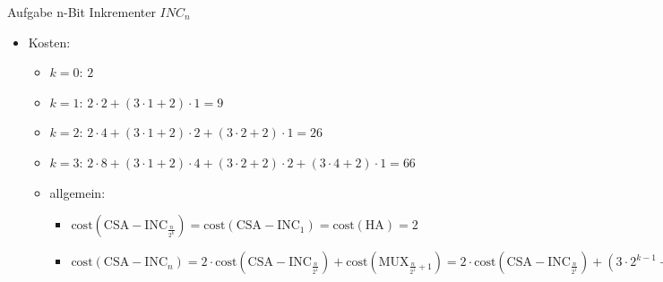 \begin{frame}{Aufgabe \thesection}{n-Bit Inkrementer $INC_n$}
  \begin{solution}
    \begin{itemize}
      \setlength{\itemsep}{0cm}
      \setlength{\parsep}{0cm}
      \setlength{\parskip}{0.2cm}
      \item \alert{Kosten:}
      \begin{itemize}
        \item \alert{$k=0$:} $2$ 
        \item \alert{$k=1$:} $2 \cdot 2 + (3\cdot1+2)\cdot 1 = 9$ 
        \item \alert{$k=2$:} $2 \cdot 4 + (3\cdot1+2)\cdot 2 + (3\cdot2+2)\cdot 1 = 26$ 
        \item \alert{$k=3$:} $2 \cdot 8 + (3\cdot1+2)\cdot 4 + (3\cdot2+2)\cdot 2 + (3\cdot4+2)\cdot 1 = 66$ 
        \item \alert{allgemein:}
        \begin{itemize}
          \item $\mathrm{cost}(\mathrm{CSA-INC}_{\frac{n}{2^k} }) = \mathrm{cost}(\mathrm{CSA-INC}_{1}) = \mathrm{cost}(\mathrm{HA}) = 2$
          \item $\displaystyle\mathrm{cost}(\mathrm{CSA-INC}_{n}) 
            = 2\cdot\mathrm{cost}(\mathrm{CSA-INC}_{\frac{n}{2^1}}) + \mathrm{cost}(\mathrm{MUX}_{\frac{n}{2^1}+1}) 
            = 2\cdot\mathrm{cost}(\mathrm{CSA-INC}_{\frac{n}{2^1}}) + (3 \cdot 2^{k-1} + 2) \cdot 1
            = 2 \cdot 2 \cdot\mathrm{cost}(\mathrm{CSA-INC}_{\frac{n}{2^2}}) + (3 \cdot 2^{k-2} + 2) \cdot 2 + (3 \cdot 2^{k-1} + 2) \cdot 1
            = 2^k \cdot\mathrm{cost}(\mathrm{CSA-INC}_{\frac{n}{2^k}}) + (3 \cdot 2^{0} + 2) \cdot 2^{k-1} + (3 \cdot 2^{1} + 2) \cdot 2^{k-2} + \ldots + (3 \cdot 2^{k-2} + 2) \cdot 2^1 + (3 \cdot 2^{k-1} + 2) \cdot 2^0 
            = n \cdot 2 + \sum_{i=0}^{k-1} (3 \cdot 2^{k-i-1} + 2) \cdot 2^i
            = n \cdot 2 + \sum_{i=0}^{log(n)-1} (3 \cdot 2^{log(n)-i-1} + 2) \cdot 2^i = 4n + 3n \cdot \frac{log(n)}{2} - 2$
        \end{itemize}
      \end{itemize}
    \end{itemize}
  \end{solution}
\end{frame}
